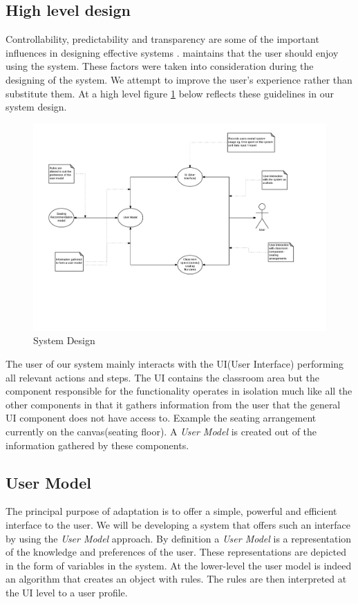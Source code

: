 \subsection{High level design}
Controllability, predictability and transparency are some of the important influences in designing effective systems \cite{hook1995glass}. \cite{rudisill1996human} maintains that the user should enjoy using the system. These factors were taken into consideration during the designing of the system. We attempt to improve the user's experience rather than substitute them. At a high level figure \ref{fig:SystemDesign} below reflects these guidelines in our system design.

\begin{figure}[!ht]
\caption{System Design}
    \label{fig:SystemDesign}
    \centering
    \includegraphics[scale=0.5]{figures/SystemDesign}
\end{figure}


The user of our system mainly interacts with the UI(User Interface) performing all relevant actions and steps. The UI contains the classroom area but the component responsible for the functionality operates in isolation much like all the other components in that it gathers information from the user that the general UI component does not have access to. Example the seating arrangement currently on the canvas(seating floor). A \emph{User Model} is created out of the information gathered by these components.

\subsection{User Model} \label{sub:UserModel}
The principal purpose of adaptation is to offer a simple, powerful and efficient interface to the user. We will be developing a system that offers such an interface by using the \emph{User Model} approach. By definition a \emph{User Model} is a representation of the knowledge and preferences of the user. These representations are depicted in the form of variables in the system. At the lower-level the user model is indeed an algorithm that creates an object with rules. The rules are then interpreted at the UI level to a user profile.

